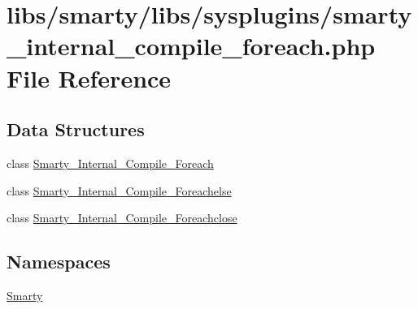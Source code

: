 \hypertarget{smarty__internal__compile__foreach_8php}{}\section{libs/smarty/libs/sysplugins/smarty\+\_\+internal\+\_\+compile\+\_\+foreach.php File Reference}
\label{smarty__internal__compile__foreach_8php}
\subsection*{Data Structures}
\begin{DoxyCompactItemize}
\item 
class \hyperlink{class_smarty___internal___compile___foreach}{Smarty\+\_\+\+Internal\+\_\+\+Compile\+\_\+\+Foreach}
\item 
class \hyperlink{class_smarty___internal___compile___foreachelse}{Smarty\+\_\+\+Internal\+\_\+\+Compile\+\_\+\+Foreachelse}
\item 
class \hyperlink{class_smarty___internal___compile___foreachclose}{Smarty\+\_\+\+Internal\+\_\+\+Compile\+\_\+\+Foreachclose}
\end{DoxyCompactItemize}
\subsection*{Namespaces}
\begin{DoxyCompactItemize}
\item 
 \hyperlink{namespace_smarty}{Smarty}
\end{DoxyCompactItemize}
